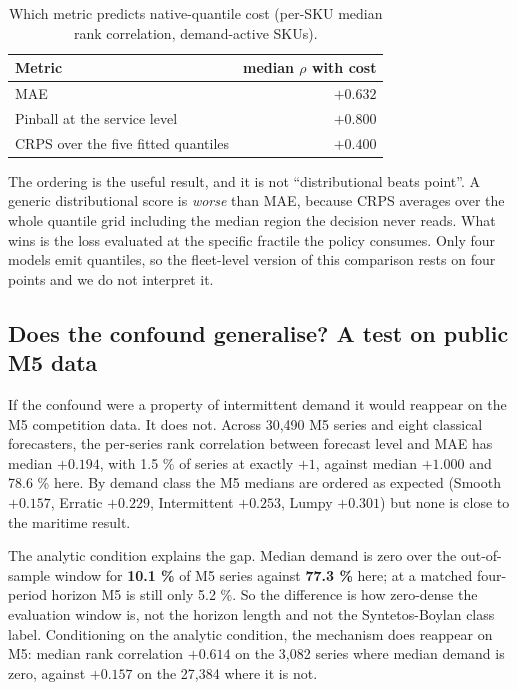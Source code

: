 \documentclass[11pt]{article}
\begin{document}
\begin{table}[htbp]
\centering
\caption{Which metric predicts native-quantile cost (per-SKU median rank
correlation, demand-active SKUs).}
\label{tab:metrics}
\begin{tabular}{lr}
\toprule
Metric & median $\rho$ with cost \\
\midrule
MAE                                  & $+0.632$ \\
Pinball at the service level         & $\mathbf{+0.800}$ \\
CRPS over the five fitted quantiles  & $+0.400$ \\
\bottomrule
\end{tabular}
\end{table}

The ordering is the useful result, and it is not ``distributional beats
point''. A generic distributional score is \emph{worse} than MAE, because CRPS
averages over the whole quantile grid including the median region the decision
never reads. What wins is the loss evaluated at the specific fractile the
policy consumes. Only four models emit quantiles, so the fleet-level version of
this comparison rests on four points and we do not interpret it.

\subsection{Does the confound generalise? A test on public M5 data}

If the confound were a property of intermittent demand it would reappear on the
M5 competition data. It does not. Across 30{,}490 M5 series and eight classical
forecasters, the per-series rank correlation between forecast level and MAE has
median $\mathbf{+0.194}$, with 1.5 \% of series at exactly $+1$, against median
$+1.000$ and 78.6 \% here. By demand class the M5 medians are ordered as
expected (Smooth $+0.157$, Erratic $+0.229$, Intermittent $+0.253$, Lumpy
$+0.301$) but none is close to the maritime result.

The analytic condition explains the gap. Median demand is zero over the
out-of-sample window for \textbf{10.1 \%} of M5 series against
\textbf{77.3 \%} here; at a matched four-period horizon M5 is still only
5.2 \%. So the difference is how zero-dense the evaluation window is, not the
horizon length and not the Syntetos-Boylan class label. Conditioning on the
analytic condition, the mechanism does reappear on M5: median rank correlation
$\mathbf{+0.614}$ on the 3{,}082 series where median demand is zero, against
$\mathbf{+0.157}$ on the 27{,}384 where it is not.
\end{document}
